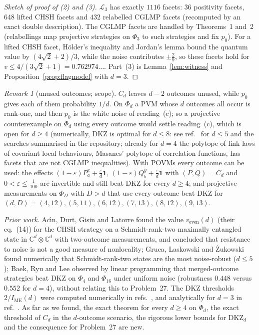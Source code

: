 \documentclass[11pt]{amsart}
\theoremstyle{definition}
\theoremstyle{remark}
\newtheorem{remark}[theorem]{Remark}
\numberwithin{equation}{section}
\newcommand{\C}{\mathbb{C}}
\newcommand{\one}{\mathbf{1}}
\newcommand{\IME}{I_{\mathrm{ME}}}
\newcommand{\cL}{\mathcal{L}}
\newcommand{\veven}{v_{\mathrm{even}}}
\newcommand{\DKZ}{\mathrm{DKZ}}
\begin{document}
\begin{proof}[Sketch of proof of (2) and (3)]
$\cL_3$ has exactly $1116$ facets: $36$ positivity facets, $648$ lifted CHSH facets and $432$ relabelled CGLMP
facets\cite{CollinsGisin} (recomputed by an exact double description). The CGLMP facets are handled by Theorems~1
and~2 (relabellings map projective strategies on $\Phi_3$ to such strategies and fix $p_0$). For a lifted CHSH facet,
H\"older's inequality and Jordan's lemma bound the quantum value by $(4\sqrt2+2)/3$, while the noise contributes
$\pm\frac29$, so these facets hold for $v\le4/(3\sqrt2+1)=0.762974\ldots$. Part~(3) is Lemma~\ref{lem:witness} and
Proposition~\ref{prop:flagmodel} with $d=3$.
\end{proof}

\begin{remark}[unused outcomes; scope]\label{rem:scope}
$C_d$ leaves $d-2$ outcomes unused, while $p_0$ gives each of them probability $1/d$. On $\Phi_d$ a PVM whose $d$
outcomes all occur is rank-one, and then $p_0$ is the white noise of reading~(c); so a projective counterexample on
$\Phi_d$ using every outcome would settle reading~(c), which is open for $d\ge4$ (numerically, DKZ is optimal for
$d\le8$: see ref.~\cite{GLZ} for $d\le5$ and the searches summarised in the repository; already for $d=4$ the polytope of
link laws of covariant local behaviours, Masanes' polytope of correlation functions\cite{Masanes}, has facets that are
not CGLMP inequalities). With POVMs every outcome can be used:
the effects $(1-\varepsilon)P^x_a+\frac\varepsilon d\one$, $(1-\varepsilon)Q^y_b+\frac\varepsilon d\one$ with $(P,Q)=C_d$
and $0<\varepsilon\le\frac1{100}$ are invertible and still beat DKZ for every $d\ge4$; and projective measurements on
$\Phi_D$ with $D>d$ that use every outcome beat DKZ for $(d,D)=(4,12),(5,11),(6,12),(7,13),(8,12),(9,13)$.
\end{remark}

\emph{Prior work.} Ac\'{\i}n, Durt, Gisin and Latorre\cite{ADGL} found the value $\veven(d)$ (their eq.~(14)) for the
CHSH strategy on a Schmidt-rank-two maximally entangled state in $\C^d\otimes\C^d$ with two-outcome measurements, and
concluded that resistance to noise is not a good measure of nonlocality; Gruca, Laskowski and \.Zukowski\cite{GLZ} found
numerically that Schmidt-rank-two states are the most noise-robust ($d\le5$); Baek, Ryu and Lee\cite{BRL} observed by
linear programming that merged-outcome strategies beat DKZ on $\Phi_4$ and $\Phi_{16}$ under uniform noise (robustness
$0.448$ versus $0.552$ for $d=4$), without relating this to Problem~27. The DKZ thresholds $2/\IME(d)$ were computed
numerically in refs.~\cite{KGZMZ,DKZ,CGLMP,GLZ}, and analytically for $d=3$ in ref.~\cite{Chen01}. As far as we found,
the exact theorem for every $d\ge4$ on $\Phi_d$, the exact threshold of $C_d$ in the $d$-outcome scenario, the rigorous
lower bounds for $\DKZ_d$ and the consequence for Problem~27 are new.
\end{document}
